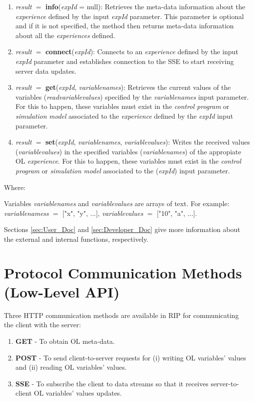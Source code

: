 \begin{enumerate}
    \item \textit{result} $=$ \textbf{info}(\textit{expId} = null): Retrieves the meta-data information about the \textit{experience} defined by the input \textit{expId} parameter.  This parameter is optional and if it is not specified, the method then returns meta-data information about all the \textit{experiences} defined.
    \item \textit{result} $=$ \textbf{connect}(\textit{expId}): Connects to an \textit{experience} defined by the input \textit{expId} parameter and establishes connection to the SSE to start receiving server data updates.
    \item \textit{result} $=$ \textbf{get}(\textit{expId}, \textit{variablenames}): Retrieves the current values of the variables (\textit{readvariablevalues}) specified by the \textit{variablenames} input parameter. For this to happen, these variables must exist in the \textit{control program} or \textit{simulation model} associated to the \textit{experience} defined by the \textit{expId} input parameter.
    \item \textit{result} $=$ \textbf{set}(\textit{expId}, \textit{variablenames}, \textit{variablevalues}): Writes the received values (\textit{variablevalues}) in the specified variables (\textit{variablenames}) of the appropiate OL \textit{experience}. For this to happen, these variables must exist in the \textit{control program} or \textit{simulation model} associated to the (\textit{expId}) input parameter.
\end{enumerate}

Where:

Variables \textit{variablenames} and \textit{variablevalues} are arrays of text. For example: \textit{variablenamess} $=$ ["x", "y", ...], \textit{variablevalues} $=$ ["10", "a", ...].

Sections \ref{sec:User_Doc} and \ref{sec:Developer_Doc} give more information about the external and internal functions, respectively.

\section{Protocol Communication Methods (Low-Level API)}
Three HTTP communication methods are available in RIP for communicating the client with the server:

\begin{enumerate}
    \item \textbf{GET} - To obtain OL meta-data.
    \item \textbf{POST} - To send client-to-server requests for (i) writing OL variables' values and (ii) reading OL variables' values.
    \item \textbf{SSE} - To subscribe the client to data streams so that it receives server-to-client OL variables' values updates.
\end{enumerate}


